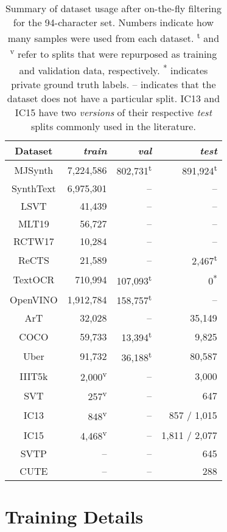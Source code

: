 \begin{table}[htbp]
  \centering
  \fontsize{6.5}{7.8}\selectfont
  \caption{Summary of dataset usage after on-the-fly filtering for the 94-character set. Numbers indicate how many samples were used from each dataset. \textsuperscript{t} and \textsuperscript{v} refer to splits that were repurposed as training and validation data, respectively. \textsuperscript{*} indicates private ground truth labels. -- indicates that the dataset does not have a particular split. IC13 and IC15 have two \textit{versions} of their respective \textit{test} splits commonly used in the literature.}
  \setlength{\tabcolsep}{10pt}
  \begin{tabular}{ c | r r r }
    \toprule
    Dataset & \textit{train} & \textit{val} & \textit{test} \\
    \midrule
    MJSynth & 7,224,586 & 802,731\textsuperscript{t} & 891,924\textsuperscript{t} \\
    SynthText & 6,975,301 & -- & -- \\
    \midrule
    LSVT & 41,439 & -- & -- \\
    MLT19 & 56,727 & -- & -- \\
    RCTW17 & 10,284 & -- & -- \\
    ReCTS & 21,589 & -- & 2,467\textsuperscript{t} \\
    TextOCR & 710,994 & 107,093\textsuperscript{t} & 0\textsuperscript{*} \\
    OpenVINO & 1,912,784 & 158,757\textsuperscript{t} & -- \\
    \midrule
    ArT & 32,028 & -- & 35,149 \\
    COCO & 59,733 & 13,394\textsuperscript{t} & 9,825 \\
    Uber & 91,732 & 36,188\textsuperscript{t} & 80,587 \\
    \midrule
    IIIT5k & 2,000\textsuperscript{v} & -- & 3,000 \\
    SVT & 257\textsuperscript{v} & -- & 647 \\
    IC13 & 848\textsuperscript{v} & -- & 857 / 1,015 \\
    IC15 & 4,468\textsuperscript{v} & -- & 1,811 / 2,077 \\
    SVTP & -- & -- & 645 \\
    CUTE & -- & -- & 288 \\
    \bottomrule
  \end{tabular}
  \label{tab:dataset}
\end{table}


\section{Training Details}

